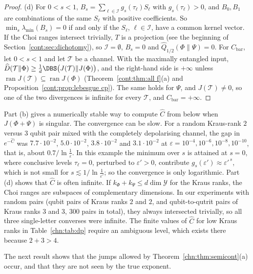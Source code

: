 \begin{proof}
(d) For $0<s<1$, $B_s=\sum_{\ell\in\mathcal I}g_s(\tau_\ell)S_\ell$ with $g_s(\tau_\ell)>0$, and $B_0,B_1$ are combinations of the same $S_\ell$ with positive coefficients. So $\min_s\lambda_{\min}(B_s)=0$ if and only if the $S_\ell$, $\ell\in\mathcal I$, have a common kernel vector. If the Choi ranges intersect trivially, $T$ is a projection (see the beginning of Section~\ref{cont:sec:dichotomy}), so $\mathcal I=\emptyset$, $B_s=0$ and $\widehat Q_{1/2}(\Phi\|\Psi)=0$. For $C_{\mathrm{bar}}$, let $0<s<1$ and let $\mathcal T$ be a channel. With the maximally entangled input, $\widehat D(\mathcal T\|\Phi)\ge\frac1d\DBS\big(J(\mathcal T)\|J(\Phi)\big)$, and the right-hand side is $+\infty$ unless $\operatorname{ran}J(\mathcal T)\subseteq\operatorname{ran}J(\Phi)$ (Theorem~\ref{cont:thm:all f}(a) and Proposition~\ref{cont:prop:lebesgue cp}). The same holds for $\Psi$, and $J(\mathcal T)\neq0$, so one of the two divergences is infinite for every $\mathcal T$, and $C_{\mathrm{bar}}=+\infty$.
\end{proof}

Part (b) gives a numerically stable way to compute $\widehat C$ from below when $J(\Phi+\Psi)$ is singular. The convergence can be slow. For a random Kraus-rank $2$ versus $3$ qubit pair mixed with the completely depolarising channel, the gap in $e^{-\widehat C}$ was $7.7\cdot10^{-2}$, $5.0\cdot10^{-2}$, $3.8\cdot10^{-2}$ and $3.1\cdot10^{-2}$ at $\varepsilon=10^{-4},10^{-6},10^{-8},10^{-10}$, that is, about $0.7/\ln\frac1\varepsilon$. In this example the minimum over $s$ is attained at $s=0$, where conclusive levels $\tau_\ell=0$, perturbed to $\varepsilon'>0$, contribute $g_s(\varepsilon')\approx\varepsilon'^{\,s}$, which is not small for $s\lesssim1/\ln\frac1{\varepsilon'}$; so the convergence is only logarithmic. Part (d) shows that $\widehat C$ is often infinite. If $k_\Phi+k_\Psi\le d\dim\mathcal Y$ for the Kraus ranks, the Choi ranges are subspaces of complementary dimensions. In our experiments with random pairs (qubit pairs of Kraus ranks $2$ and $2$, and qubit-to-qutrit pairs of Kraus ranks $3$ and $3$, $300$ pairs in total), they always intersected trivially, so all three single-letter converses were infinite. The finite values of $\widehat C$ for low Kraus ranks in Table~\ref{chn:tab:dp} require an ambiguous level, which exists there because $2+3>4$.

The next result shows that the jumps allowed by Theorem~\ref{chn:thm:semicont}(a) occur, and that they are not seen by the true exponent.

